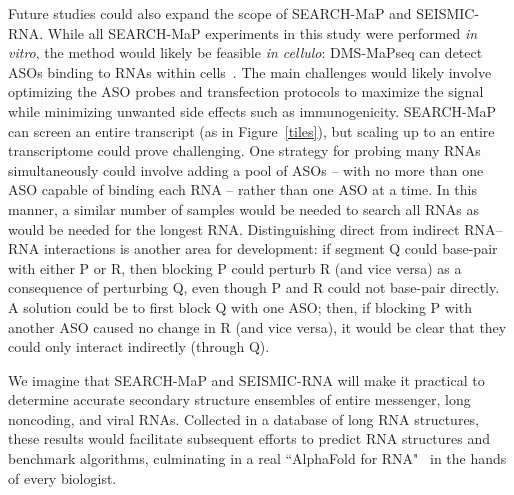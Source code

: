 \documentclass[main.tex]{subfiles}
\begin{document}
Future studies could also expand the scope of SEARCH-MaP and SEISMIC-RNA.
While all SEARCH-MaP experiments in this study were performed \textit{in vitro}, the method would likely be feasible \textit{in cellulo}: DMS-MaPseq can detect ASOs binding to RNAs within cells~\cite{Zhu2022}.
The main challenges would likely involve optimizing the ASO probes and transfection protocols to maximize the signal while minimizing unwanted side effects such as immunogenicity.
SEARCH-MaP can screen an entire transcript (as in Figure~\ref{tiles}), but scaling up to an entire transcriptome could prove challenging.
One strategy for probing many RNAs simultaneously could involve adding a pool of ASOs -- with no more than one ASO capable of binding each RNA -- rather than one ASO at a time.
In this manner, a similar number of samples would be needed to search all RNAs as would be needed for the longest RNA.
Distinguishing direct from indirect RNA--RNA interactions is another area for development: if segment Q could base-pair with either P or R, then blocking P could perturb R (and vice versa) as a consequence of perturbing Q, even though P and R could not base-pair directly.
A solution could be to first block Q with one ASO; then, if blocking P with another ASO caused no change in R (and vice versa), it would be clear that they could only interact indirectly (through Q).

We imagine that SEARCH-MaP and SEISMIC-RNA will make it practical to determine accurate secondary structure ensembles of entire messenger, long noncoding, and viral RNAs.
Collected in a database of long RNA structures, these results would facilitate subsequent efforts to predict RNA structures and benchmark algorithms, culminating in a real ``AlphaFold for RNA"~\cite{Schneider2023} in the hands of every biologist.
\end{document}
